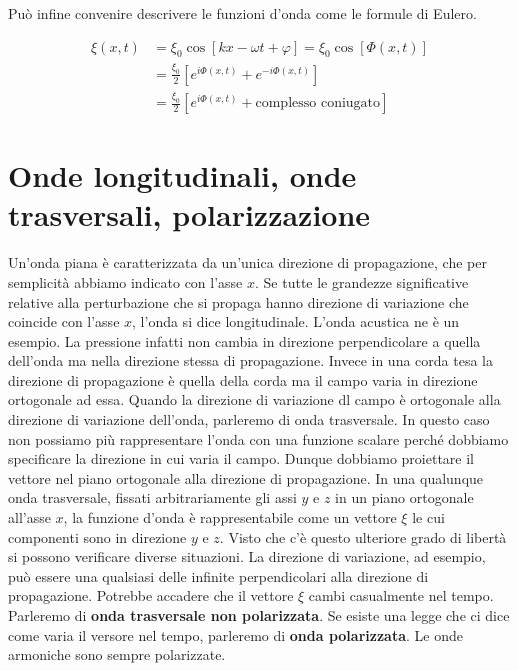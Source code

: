 Può infine convenire descrivere le funzioni d'onda come le formule di Eulero.

\begin{equation*}
	\begin{aligned}
		\xi(x,t) &= \xi_0\cos [kx-\omega t+\varphi] = \xi_0\cos [\Phi (x,t)] \\
		&= \frac{\xi_0}{2} [e^{i\Phi (x,t)} + e^{-i\Phi (x,t)}] \\
		&= \frac{\xi_0}{2} [e^{i\Phi (x,t)} + \text{complesso coniugato} ]
	\end{aligned}
\end{equation*}

\section{Onde longitudinali, onde trasversali, polarizzazione}

Un'onda piana è caratterizzata da un'unica direzione di propagazione, che per semplicità abbiamo indicato con l'asse $x$. Se tutte le grandezze significative relative
alla perturbazione che si propaga hanno direzione di
variazione che coincide con l'asse $x$, l'onda si dice longitudinale. L'onda acustica ne è un esempio. La pressione infatti non cambia in direzione perpendicolare a quella dell'onda ma nella direzione stessa di propagazione.
Invece in una corda tesa la direzione di propagazione è quella della corda ma il campo varia in direzione ortogonale ad essa. Quando la direzione di variazione dl campo è ortogonale alla direzione di variazione dell'onda, parleremo di onda trasversale. In questo caso non possiamo più rappresentare l'onda con una funzione scalare perché dobbiamo specificare la direzione in cui varia il campo. Dunque dobbiamo proiettare il vettore nel piano ortogonale alla direzione di propagazione. In una qualunque onda trasversale, fissati arbitrariamente gli assi $y$ e $z$ in un piano ortogonale all'asse $x$, la funzione d'onda è rappresentabile come un vettore $\xi$ le cui componenti sono in direzione $y$ e $z$. Visto che c'è questo ulteriore grado di libertà si possono verificare diverse situazioni. La direzione di variazione, ad esempio, può essere una qualsiasi delle infinite perpendicolari alla direzione di propagazione.
Potrebbe accadere che il vettore $\xi$ cambi casualmente nel tempo. Parleremo di \textbf{onda trasversale non polarizzata}. Se esiste una legge che ci dice come varia il versore nel tempo, parleremo di \textbf{onda polarizzata}. Le onde armoniche sono sempre polarizzate.

